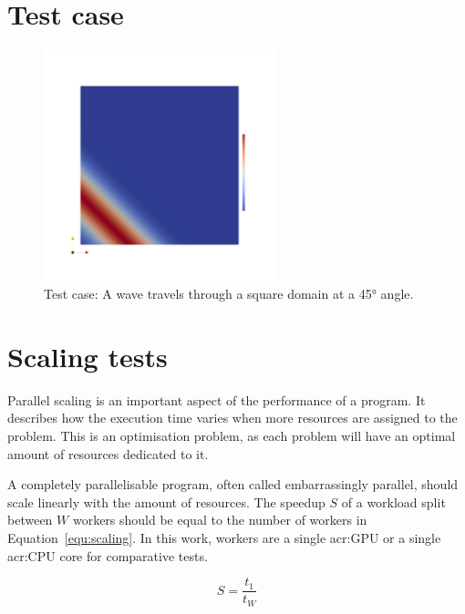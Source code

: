\section{Test case} \label{section:results:test_case}

\begin{figure}[H]
	\centering
	\includegraphics[width=0.6\textwidth]{Chapter_results/media/problem_1}
	\caption{Test case: A wave travels through a square domain at a 45° angle.}
	\label{fig:problem}
\end{figure}

\section{Scaling tests} \label{section:results:scaling_tests}

Parallel scaling is an important aspect of the performance of a program. It describes how the
execution time varies when more resources are assigned to the problem. This is an optimisation
problem, as each problem will have an optimal amount of resources dedicated to it. 

A completely parallelisable program, often called embarrassingly parallel, should scale linearly
with the amount of resources. The speedup $S$ of a workload split between $W$ workers should be
equal to the number of workers in Equation~\ref{equ:scaling}. In this work, workers are a single
\acrshort{acr:GPU} or a single \acrshort{acr:CPU} core for comparative tests.

\begin{equation} \label{equ:scaling}
	S = \frac{t_1}{t_W}
\end{equation}

